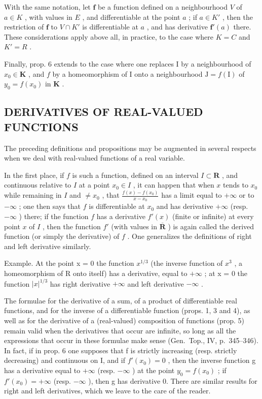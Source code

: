 With the same notation, let \(\mathbf{f}\) be a function defined on a neighbourhood \(V\) of \(a \in K\) , with values in \(E\) , and differentiable at the point \(a\) ; if \(a \in K'\) , then the restriction of \(\mathbf{f}\) to \(V \cap K'\) is differentiable at \(a\) , and has derivative \(\mathbf{f}'(a)\) there. These considerations apply above all, in practice, to the case where \(K = C\) and \(K' = R\) .

Finally, prop. 6 extends to the case where one replaces I by a neighbourhood of \(x_0 \in \mathbf{K}\) , and \(f\) by a homeomorphism of I onto a neighbourhood \(\mathrm{J} = f(\mathrm{I})\) of \(y_0 = f(x_0)\) in \(\mathbf{K}\) .

\subsection{DERIVATIVES OF REAL-VALUED FUNCTIONS}

The preceding definitions and propositions may be augmented in several respects when we deal with real-valued functions of a real variable.

In the first place, if \(f\) is such a function, defined on an interval \(I \subset \mathbf{R}\) , and continuous relative to \(I\) at a point \(x_0 \in I\) , it can happen that when \(x\) tends to \(x_0\) while remaining in \(I\) and \(\neq x_0\) , that \(\frac{f(x) - f(x_0)}{x - x_0}\) has a limit equal to \(+\infty\) or to \(-\infty\) ; one then says that \(f\) is differentiable at \(x_0\) and has derivative \(+\infty\) (resp. \(-\infty\) ) there; if the function \(f\) has a derivative \(f'(x)\) (finite or infinite) at every point \(x\) of \(I\) , then the function \(f'\) (with values in \(\overline{\mathbf{R}}\) ) is again called the derived function (or simply the derivative) of \(f\) . One generalizes the definitions of right and left derivative similarly.

Example. At the point x = 0 the function \(x^{1/3}\) (the inverse function of \(x^{3}\) , a homeomorphism of R onto itself) has a derivative, equal to \(+\infty\) ; at x = 0 the function \(|x|^{1/3}\) has right derivative \(+\infty\) and left derivative \(-\infty\) .

The formulae for the derivative of a sum, of a product of differentiable real functions, and for the inverse of a differentiable function (props. 1, 3 and 4), as well as for the derivative of a (real-valued) composition of functions (prop. 5) remain valid when the derivatives that occur are infinite, so long as all the expressions that occur in these formulae make sense (Gen.~Top., IV, p.~345--346). In fact, if in prop. 6 one supposes that f is strictly increasing (resp. strictly decreasing) and continuous on I, and if \(f'(x_{0}) = 0\) , then the inverse function g has a derivative equal to \(+\infty\) (resp. \(-\infty\) ) at the point \(y_{0} = f(x_{0})\) ; if \(f'(x_{0}) = +\infty\) (resp. \(-\infty\) ), then g has derivative 0. There are similar results for right and left derivatives, which we leave to the care of the reader.

